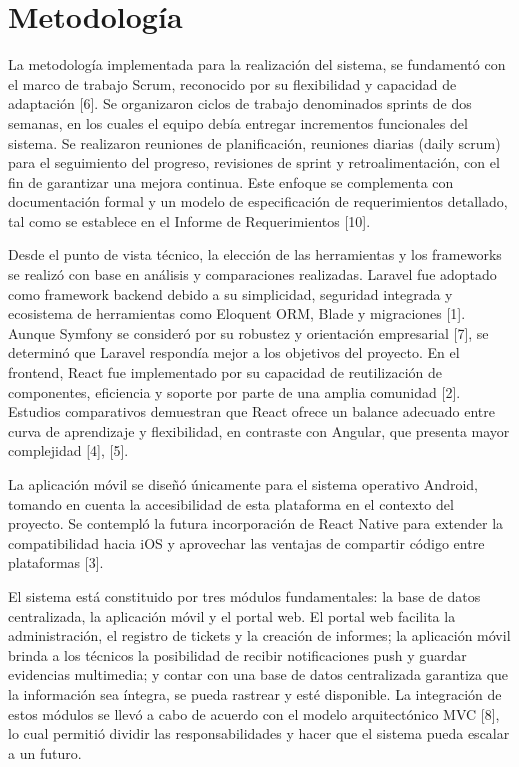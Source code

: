 \section{Metodología}
La metodología implementada para la realización del sistema, se fundamentó con el 
marco de trabajo Scrum, reconocido por su flexibilidad y capacidad de adaptación [6]. Se 
organizaron ciclos de trabajo denominados sprints de dos semanas, en los cuales el 
equipo debía entregar incrementos funcionales del sistema. Se realizaron reuniones de 
planificación, reuniones diarias (daily scrum) para el seguimiento del progreso, revisiones 
de sprint y retroalimentación, con el fin de garantizar una mejora continua. Este enfoque 
se complementa con documentación formal y un modelo de especificación de 
requerimientos detallado, tal como se establece en el Informe de Requerimientos [10]. 

Desde el punto de vista técnico, la elección de las herramientas y los frameworks se 
realizó con base en análisis y comparaciones realizadas. Laravel fue adoptado como 
framework backend debido a su simplicidad, seguridad integrada y ecosistema de 
herramientas como Eloquent ORM, Blade y migraciones [1]. Aunque Symfony se 
consideró por su robustez y orientación empresarial [7], se determinó que Laravel 
respondía mejor a los objetivos del proyecto. En el frontend, React fue implementado por 
su capacidad de reutilización de componentes, eficiencia y soporte por parte de una 
amplia comunidad [2]. Estudios comparativos demuestran que React ofrece un balance 
adecuado entre curva de aprendizaje y flexibilidad, en contraste con Angular, que 
presenta mayor complejidad [4], [5]. 

La aplicación móvil se diseñó únicamente para el sistema operativo Android, tomando en 
cuenta la accesibilidad de esta plataforma en el contexto del proyecto. Se contempló la 
futura incorporación de React Native para extender la compatibilidad hacia iOS y 
aprovechar las ventajas de compartir código entre plataformas [3]. 

El sistema está constituido por tres módulos fundamentales: la base de datos centralizada, 
la aplicación móvil y el portal web. El portal web facilita la administración, el registro de 
tickets y la creación de informes; la aplicación móvil brinda a los técnicos la posibilidad 
de recibir notificaciones push y guardar evidencias multimedia; y contar con una base de 
datos centralizada garantiza que la información sea íntegra, se pueda rastrear y esté 
disponible. La integración de estos módulos se llevó a cabo de acuerdo con el modelo 
arquitectónico MVC [8], lo cual permitió dividir las responsabilidades y hacer que el 
sistema pueda escalar a un  futuro. 